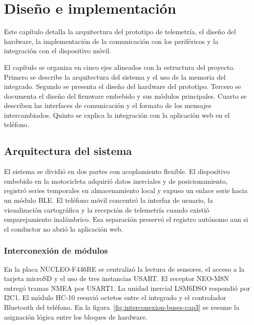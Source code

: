 \chapter{Diseño e implementación}

\label{Chapter3}

Este capítulo detalla la arquitectura del prototipo de telemetría, el diseño del hardware, la implementación de la comunicación con los periféricos y la integración con el dispositivo móvil.

El capítulo se organiza en cinco ejes alineados con la estructura del proyecto. Primero se describe la arquitectura del sistema y el uso de la memoria del integrado. Segundo se presenta el diseño del hardware del prototipo. Tercero se documenta el diseño del firmware embebido y sus módulos principales. Cuarto se describen las interfaces de comunicación y el formato de los mensajes intercambiados. Quinto se explica la integración con la aplicación web en el teléfono.

\section{Arquitectura del sistema}
\label{sec:arquitectura-sistema}

El sistema se dividió en dos partes con acoplamiento flexible. El dispositivo embebido en la motocicleta adquirió datos inerciales y de posicionamiento, registró series temporales en almacenamiento local y expuso un enlace serie hacia un módulo BLE. El teléfono móvil concentró la interfaz de usuario, la visualización cartográfica y la recepción de telemetría cuando existió emparejamiento inalámbrico. Esa separación preservó el registro autónomo aun si el conductor no abrió la aplicación web.

\subsection{Interconexión de módulos}

En la placa NUCLEO-F446RE se centralizó la lectura de sensores, el acceso a la tarjeta microSD y el uso de tres instancias USART. El receptor NEO-M8N entregó tramas NMEA por USART1. La unidad inercial LSM6DSO respondió por I2C1. El módulo HC-10 reenvió octetos entre el integrado y el controlador Bluetooth del teléfono. En la figura~\ref{fig:interconexion-buses-cap3} se resume la asignación lógica entre los bloques de hardware.

